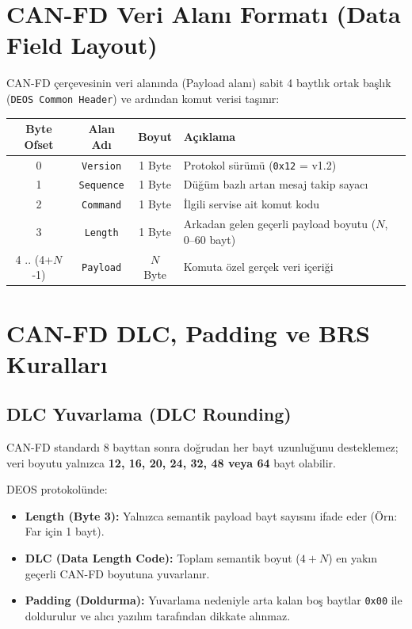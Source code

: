 \documentclass[a4paper,10pt]{article}
\newcommand{\hex}[1]{\texttt{0x#1}}
\newcommand{\code}[1]{\texttt{#1}}
\begin{document}
\section{CAN-FD Veri Alanı Formatı (Data Field Layout)}

CAN-FD çerçevesinin veri alanında (Payload alanı) sabit 4 baytlık ortak başlık (\code{DEOS Common Header}) ve ardından komut verisi taşınır:

\begin{center}
\begin{tabular}{c c c l}
\toprule
\textbf{Byte Ofset} & \textbf{Alan Adı} & \textbf{Boyut} & \textbf{Açıklama} \\
\midrule
0 & \code{Version} & 1 Byte & Protokol sürümü (\hex{12} = v1.2) \\
1 & \code{Sequence} & 1 Byte & Düğüm bazlı artan mesaj takip sayacı \\
2 & \code{Command} & 1 Byte & İlgili servise ait komut kodu \\
3 & \code{Length} & 1 Byte & Arkadan gelen geçerli payload boyutu ($N$, 0--60 bayt) \\
\midrule
4 .. (4+$N$-1) & \code{Payload} & $N$ Byte & Komuta özel gerçek veri içeriği \\
\bottomrule
\end{tabular}
\end{center}

\section{CAN-FD DLC, Padding ve BRS Kuralları}

\subsection{DLC Yuvarlama (DLC Rounding)}

CAN-FD standardı 8 bayttan sonra doğrudan her bayt uzunluğunu desteklemez; veri boyutu yalnızca \textbf{12, 16, 20, 24, 32, 48 veya 64} bayt olabilir.

DEOS protokolünde:
\begin{itemize}
    \item \textbf{Length (Byte 3):} Yalnızca semantik payload bayt sayısını ifade eder (Örn: Far için 1 bayt).
    \item \textbf{DLC (Data Length Code):} Toplam semantik boyut ($4 + N$) en yakın geçerli CAN-FD boyutuna yuvarlanır.
    \item \textbf{Padding (Doldurma):} Yuvarlama nedeniyle arta kalan boş baytlar \hex{00} ile doldurulur ve alıcı yazılım tarafından dikkate alınmaz.
\end{itemize}
\end{document}
